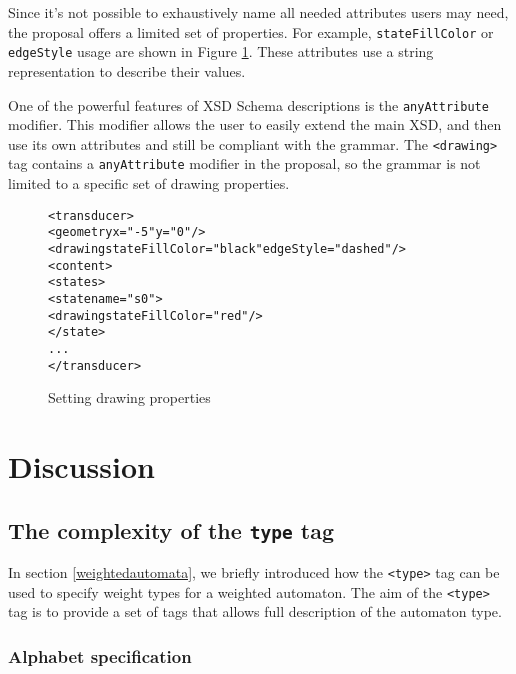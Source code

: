 \documentclass[a4paper]{article}
\begin{document}
Since it's not possible to exhaustively
name all needed attributes users may need, the proposal offers a
limited set of properties. For example, \verb|stateFillColor| or
\verb|edgeStyle| usage are shown in Figure \ref{drawing1}. These
attributes use a string representation to describe their values.

One of the powerful features of XSD Schema descriptions is the
\verb|anyAttribute| modifier. This modifier allows the user to easily
extend the main XSD, and then use its own attributes and still be
compliant with the grammar. The \verb|<drawing>| tag contains a
\verb|anyAttribute| modifier in the proposal, so the grammar is not
limited to a specific set of drawing properties.


{\small

\begin{figure}[h]
  \begin{center}
\begin{alltt}
<transducer>
  <geometry x="-5" y="0"/> 
  <drawing stateFillColor="black" edgeStyle="dashed"/>
  <content>
     <states>
        <state name="s0">
            <drawing stateFillColor="red"/>
        </state>
      ...
</transducer>
\end{alltt}

\caption{Setting drawing properties}
\label{drawing1}
  \end{center}
\end{figure}

}



\section{Discussion}

\subsection{The complexity of the {\tt type} tag}
\label{deepertypetag}

In section \ref{weightedautomata}, we briefly introduced how the
\verb|<type>| tag can be used to specify weight types for a weighted
automaton. The aim of the \verb|<type>| tag is to provide a set of
tags that allows full description of the automaton type.


\subsubsection{Alphabet specification}
\end{document}
